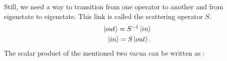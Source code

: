 \documentclass[12pt, titlepage]{article}
\begin{document}
\begin{subappendices}
Still, we need a way to transition from one operator to another and from eigenstate to eigenstate. This link is called the scattering operator $ S $.
\begin{subequations}
\begin{align}
\ket{out}=S^{-1}\ket{in}
&\\
\ket{in}=S\ket{out}.
\end{align}
\end{subequations}
The scalar product of the mentioned two vacua can be written as :

\end{subappendices}
\end{document}
